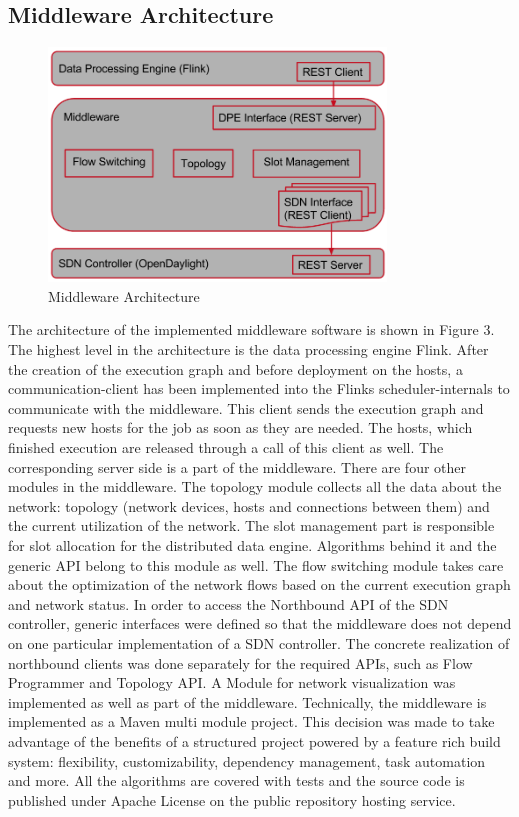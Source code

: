 \subsection{Middleware Architecture}

\begin{figure}[h]
    \centering
    \includegraphics[width=0.8\textwidth]{graphics/architecture.png}
    \caption{Middleware Architecture}
    \label{fig:architecture}
\end{figure}

The architecture of the implemented middleware software is shown in Figure 3. The highest level in
the architecture is the data processing engine Flink. After the creation of the execution graph and
before deployment on the hosts, a communication-client has been implemented into the Flinks
scheduler-internals to communicate with the middleware. This client sends the execution graph and
requests new hosts for the job as soon as they are needed. The hosts, which finished execution are
released through a call of this client as well. The corresponding server side is a part of the
middleware. There are four other modules in the middleware. The topology module collects all the
data about the network: topology (network devices, hosts and connections between them) and the
current utilization of the network. The slot management part is responsible for slot allocation for
the distributed data engine. Algorithms behind it and the generic API belong to this module as well.
The flow switching module takes care about the optimization of the network flows based on the
current execution graph and network status. In order to access the Northbound API of the SDN
controller, generic interfaces were defined so that the middleware does not depend on one particular
implementation of a SDN controller. The concrete realization of northbound clients was done
separately for the required APIs, such as Flow Programmer and Topology API. A Module for network
visualization was implemented as well as part of the middleware. Technically, the middleware is
implemented as a Maven multi module project. This decision was made to take advantage of the
benefits of a structured project powered by a feature rich build system: flexibility,
customizability, dependency management, task automation and more. All the algorithms are covered
with tests and the source code is published under Apache License on the public repository hosting
service.

